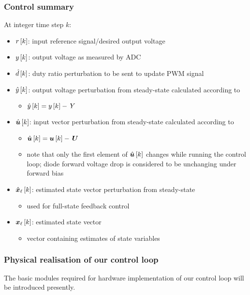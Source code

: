 \subsubsection{Control summary}
At integer time step $k$:
\begin{itemize}
\item $r\left[k\right]$: input reference signal/desired output voltage
\item $y\left[k\right]$: output voltage as measured by ADC
\item $\hat{d}\left[k\right]$: duty ratio perturbation to be sent to update PWM signal
\item $\hat{y}\left[k\right]$: output voltage perturbation from steady-state calculated according to
    \begin{itemize}
    \item $\hat{y}\left[k\right] = y\left[k\right] - \, Y$
    \end{itemize}
\item $\hat{\boldsymbol{u}}\left[k\right]$: input vector perturbation from steady-state calculated according to
    \begin{itemize}
    \item $\hat{\boldsymbol{u}}\left[k\right] = \boldsymbol{u}\left[k\right] - \, \boldsymbol{U}$
    \item note that only the first element of $\hat{\boldsymbol{u}}\left[k\right]$ changes while running the control loop; diode forward voltage drop is considered to be unchanging under forward bias
    \end{itemize}
\item $\hat{\boldsymbol{x}}_\ell\left[k\right]$: estimated state vector perturbation from steady-state
    \begin{itemize}
    \item used for full-state feedback control
    \end{itemize}
\item $\boldsymbol{x}_\ell\left[k\right]$: estimated state vector
    \begin{itemize}
    \item vector containing estimates of state variables
    \end{itemize}
\end{itemize}
\subsubsection{Physical realisation of our control loop}\label{sec:hardware_for_control}
The basic modules required for hardware implementation of our control loop will be introduced presently.
